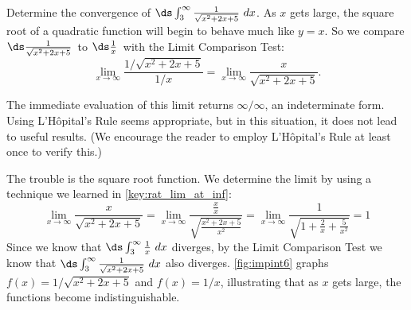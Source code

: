 \begin{example}\label{ex_impint6}
Determine the convergence of $\ds \int_3^{\infty} \frac{1}{\sqrt{x^2+2x+5}}\ dx$.
\solution
As $x$ gets large, the square root of a quadratic function will begin to behave much like $y=x$. So we compare \small$\ds\frac{1}{\sqrt{x^2+2x+5}}$\normalsize\ to \small$\ds\frac1x$\normalsize\ with the Limit Comparison Test:
\[
\lim_{x\to\infty} \frac{1/\sqrt{x^2+2x+5}}{1/x}
= \lim_{x\to\infty}\frac{x}{\sqrt{x^2+2x+5}}.
\]

The immediate evaluation of this limit returns $\infty/\infty$, an indeterminate form. Using L'H\^opital's Rule seems appropriate, but in this situation, it does not lead to useful results. (We encourage the reader to employ L'H\^opital's Rule at least once to verify this.)

The trouble is the square root function.
We determine the limit by using a technique we learned in \autoref{key:rat_lim_at_inf}:
%
%
\[
 \lim_{x\to\infty}\frac x{\sqrt{x^2+2x+5}}
 =\lim_{x\to\infty}\frac{\frac xx}{\sqrt{\frac{x^2+2x+5}{x^2}}}
 =\lim_{x\to\infty}\frac1{\sqrt{1+\frac2x+\frac5{x^2}}}=1
\]
Since we know that $\ds\int_3^{\infty} \tfrac1x\ dx$ diverges, by the Limit Comparison Test we know that $\ds\int_3^\infty\tfrac1{\sqrt{x^2+2x+5}}\ dx$ also diverges. \autoref{fig:impint6} graphs $f(x)=1/\sqrt{x^2+2x+5}$ and $f(x)=1/x$, illustrating that as $x$ gets large, the functions become in\-dis\-tin\-guish\-a\-ble.
\end{example}


